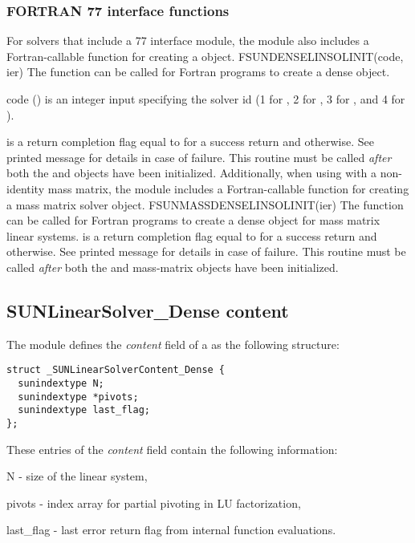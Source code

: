 \subsubsection*{FORTRAN 77 interface functions}
For solvers that include a {\F} 77 interface module, the {\sunlinsoldense}
module also includes a Fortran-callable function for creating a
 object.
%
%
{
  FSUNDENSELINSOLINIT(code, ier)
}
{
  The function  can be called for Fortran programs
  to create a dense  object.
}
{
  \begin{args}[code]
  \item[code] ()
    is an integer input specifying the solver id (1 for {\cvode}, 2
    for {\ida}, 3 for {\kinsol}, and 4 for {\arkode}).
  \end{args}
}
{
   is a return completion flag equal to  for a success
  return and  otherwise. See printed message for details in case
  of failure.
}
{
  This routine must be
  called \emph{after} both the {\nvector} and {\sunmatrix} objects have
  been initialized.
}
Additionally, when using {\arkode} with a non-identity
mass matrix, the {\sunlinsoldense} module includes a Fortran-callable
function for creating a  mass matrix solver
object.
%
%
{
  FSUNMASSDENSELINSOLINIT(ier)
}
{
  The function  can be called for Fortran programs
  to create a dense  object for mass matrix linear
  systems.
}
{}
{
   is a  return completion flag equal to  for a success
  return and  otherwise. See printed message for details in case
  of failure.
}
{
  This routine must be
  called \emph{after} both the {\nvector} and {\sunmatrix} mass-matrix
  objects have been initialized.
}


\subsection{SUNLinearSolver\_Dense content}
\label{ss:sunlinsol_dense_content}

The {\sunlinsoldense} module defines the \textit{content} field of a
 as the following structure:
\begin{verbatim}
struct _SUNLinearSolverContent_Dense {
  sunindextype N;
  sunindextype *pivots;
  sunindextype last_flag;
};
\end{verbatim}
These entries of the \emph{content} field contain the following
information:
\begin{args}
  \item[N] - size of the linear system,
  \item[pivots] - index array for partial pivoting in LU factorization,
  \item[last\_flag] - last error return flag from internal function evaluations.
\end{args}
